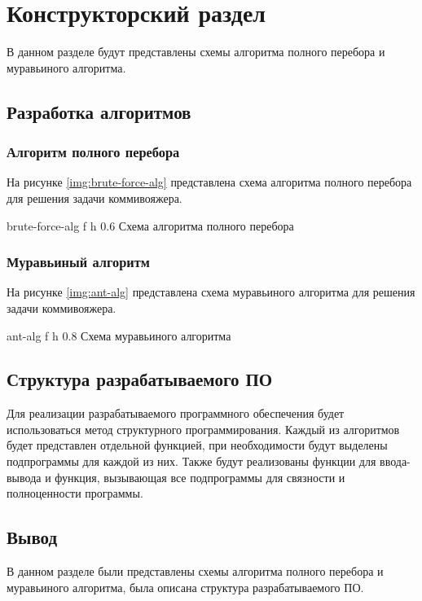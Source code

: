 \chapter{Конструкторский раздел}

В данном разделе будут представлены схемы алгоритма полного перебора и муравьиного алгоритма.

\section{Разработка алгоритмов}

\subsection{Алгоритм полного перебора}

На рисунке \ref{img:brute-force-alg} представлена схема алгоритма полного перебора для решения задачи коммивояжера.

{brute-force-alg} %
{f} %
{h} %
{0.6\textwidth} %
{Схема алгоритма полного перебора} %

\subsection{Муравьиный алгоритм}

На рисунке \ref{img:ant-alg} представлена схема муравьиного алгоритма для решения задачи коммивояжера.

{ant-alg} %
{f} %
{h} %
{0.8\textwidth} %
{Схема муравьиного алгоритма} %

\clearpage

\section{Структура разрабатываемого ПО}

Для реализации разрабатываемого программного обеспечения будет использоваться
метод структурного программирования. 
Каждый из алгоритмов будет представлен отдельной функцией, при необходимости будут выделены подпрограммы для каждой из них. 
Также будут реализованы функции для ввода-вывода и функция, вызывающая все подпрограммы для связности и полноценности программы.

\section*{Вывод}

В данном разделе были представлены схемы алгоритма полного перебора и муравьиного алгоритма, была
описана структура разрабатываемого ПО.



